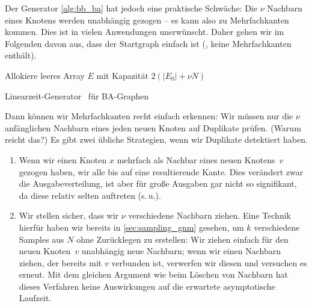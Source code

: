Der Generator \cref{alg:bb_ba} hat jedoch eine praktische Schwäche:
Die $\nu$ Nachbarn eines Knotens werden unabhängig gezogen -- es kann also zu Mehrfachkanten kommen.
Dies ist in vielen Anwendungen unerwünscht.
Daher gehen wir im Folgenden davon aus, dass der Startgraph einfach ist (\dh, keine Mehrfachkanten enthält).

\begin{algorithm}[t]

	Allokiere leeres Array $E$ mit Kapazität $2(|E_0| + \nu N)$\;

	\caption{Linearzeit-Generator~\cite{batagelj2005efficient} für BA-Graphen}
	\label{alg:bb_ba}
\end{algorithm}

Dann können wir Mehrfachkanten recht einfach erkennen:
Wir müssen nur die $\nu$ anfänglichen Nachbarn eines jeden neuen Knoten auf Duplikate prüfen.
(Warum reicht das?)
Es gibt zwei übliche Strategien, wenn wir Duplikate detektiert haben.

\begin{enumerate}
    \item Wenn wir einen Knoten $x$ mehrfach als Nachbar eines neuen Knotens~$v$ gezogen haben,  wir alle bis auf eine resultierende Kante.
          Dies verändert zwar die Ausgabeverteilung, ist aber für große Ausgaben gar nicht so signifikant, da diese relativ selten auftreten (s.\,u.).

    \item Wir stellen sicher, dass wir $\nu$ verschiedene Nachbarn ziehen.
          Eine Technik hierfür haben wir bereits in \cref{sec:sampling_gnm} gesehen, um $k$ verschiedene Samples aus $N$ ohne Zurücklegen zu erstellen:
          Wir ziehen einfach für den neuen Knoten~$v$ unabhängig neue Nachbarn;
          wenn wir einen Nachbarn ziehen, der bereits mit $v$ verbunden ist, verwerfen wir diesen und versuchen es erneut.
          Mit dem gleichen Argument wie beim Löschen von Nachbarn hat dieses Verfahren keine Auswirkungen auf die erwartete asymptotische Laufzeit.

\end{enumerate}

